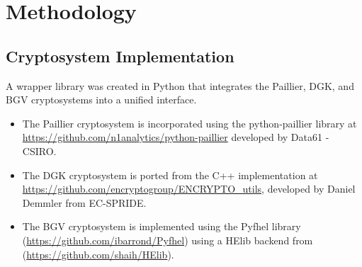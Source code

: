 \section{Methodology}
\label{sec:chapter_3}


\subsection{Cryptosystem Implementation}
A wrapper library was created in Python that integrates the Paillier, DGK, and BGV cryptosystems into a unified interface.
\begin{itemize}
	\item The Paillier cryptosystem is incorporated using the python-paillier library at \url{https://github.com/n1analytics/python-paillier} developed by Data61 - CSIRO.
	\item The DGK cryptosystem is ported from the C++ implementation at \url{https://github.com/encryptogroup/ENCRYPTO_utils}, developed by Daniel Demmler from EC-SPRIDE.
	\item The BGV cryptosystem is implemented using the Pyfhel library (\url{https://github.com/ibarrond/Pyfhel}) using a HElib backend from (\url{https://github.com/shaih/HElib}).
\end{itemize}


